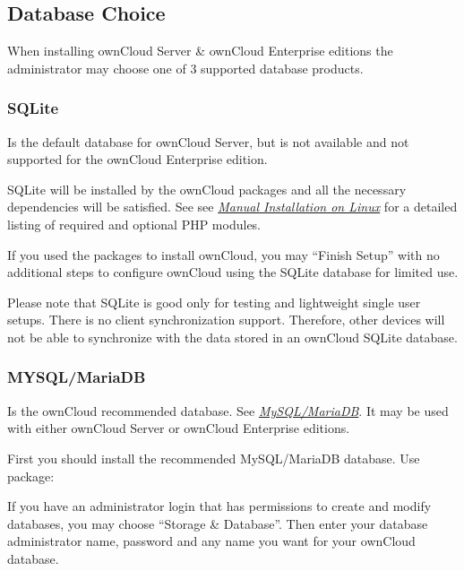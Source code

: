 \documentclass[letterpaper,10pt,english]{sphinxmanual}
\begin{document}
\subsection{Database Choice}
\label{installation/installation_wizard:database-choice-label}\label{installation/installation_wizard:database-choice}
When installing ownCloud Server \& ownCloud Enterprise editions the administrator
may choose one of 3 supported database products.


\subsubsection{SQLite}
\label{installation/installation_wizard:sqlite}
Is the default database for ownCloud Server, but is not available and not supported
for the ownCloud Enterprise edition.

SQLite will be installed by the ownCloud packages and all the necessary dependencies
will be satisfied.  See see {\hyperref[installation/source_installation::doc]{\emph{\emph{Manual Installation on Linux}}}} for a detailed listing of
required and optional PHP modules.

If you used the packages to install ownCloud, you may ``Finish Setup'' with no
additional steps to configure ownCloud using the SQLite database for limited use.

Please note that SQLite is good only for testing and lightweight single user setups.
There is no client synchronization support.  Therefore, other devices will not be able
to synchronize with the data stored in an ownCloud SQLite database.


\subsubsection{MYSQL/MariaDB}
\label{installation/installation_wizard:mysql-mariadb}
Is the ownCloud recommended database. See {\hyperref[installation/system_requirements::doc]{\emph{\emph{MySQL/MariaDB}}}}.
It may be used with either ownCloud Server or ownCloud Enterprise editions.
\begin{description}
\item[{First you should install the recommended MySQL/MariaDB database.  Use package:}] \leavevmode
{}

\end{description}

If you have an administrator login that has permissions to create and modify databases,
you may choose ``Storage \& Database''.  Then enter your database administrator name,
password and any name you want for your ownCloud database.
\end{document}
